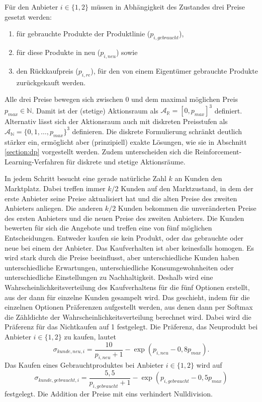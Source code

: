 Für den Anbieter $i\in\{1, 2\}$ müssen in Abhängigkeit des Zustandes drei Preise gesetzt werden:
\begin{enumerate}
	\item für gebrauchte Produkte der Produktlinie ($p_{i, gebraucht}$),
	\item für diese Produkte in neu ($p_{i, neu}$) sowie
	\item den Rückkaufpreis ($p_{i, re}$), für den von einem Eigentümer gebrauchte Produkte zurückgekauft werden.
\end{enumerate}
Alle drei Preise bewegen sich zwischen 0 und dem maximal möglichen Preis $p_{max} \in \mathbb{N}$.
Damit ist der (stetige) Aktionsraum als $\mathcal{A}_\mathbb{R}=[0{,} p_{max}]^3$ definiert.
Alternativ lässt sich der Aktionsraum auch mit diskreten Preisstufen als $\mathcal{A}_\mathbb{N}=\{0{,} 1, \ldots, p_{max}\}^3$ definieren.
Die diskrete Formulierung schränkt deutlich stärker ein, ermöglicht aber (prinzipiell) exakte Lösungen, wie sie in Abschnitt \ref{section:dp} vorgestellt werden.
Zudem unterscheiden sich die Reinforcement-Learning-Verfahren für diskrete und stetige Aktionsräume.

In jedem Schritt besucht eine gerade natürliche Zahl $k$ an Kunden den Marktplatz.
Dabei treffen immer $k / 2$ Kunden auf den Marktzustand, in dem der erste Anbieter seine Preise aktualisiert hat und die alten Preise des zweiten Anbieters anliegen.
Die anderen $k / 2$ Kunden bekommen die unveränderten Preise des ersten Anbieters und die neuen Preise des zweiten Anbieters.
Die Kunden bewerten für sich die Angebote und treffen eine von fünf möglichen Entscheidungen.
Entweder kaufen sie kein Produkt, oder das gebrauchte oder neue bei einem der Anbieter.
Das Kaufverhalten ist aber keinesfalls homogen.
Es wird stark durch die Preise beeinflusst, aber unterschiedliche Kunden haben unterschiedliche Erwartungen, unterschiedliche Konsumgewohnheiten oder unterschiedliche Einstellungen zu Nachhaltigkeit.
Deshalb wird eine Wahrscheinlichkeitsverteilung des Kaufverhaltens für die fünf Optionen erstellt, aus der dann für einzelne Kunden gesampelt wird.
Das geschieht, indem für die einzelnen Optionen Präferenzen aufgestellt werden, aus denen dann per Softmax die Zähldichte der Wahrscheinlichkeitsverteilung berechnet wird.
Dabei wird die Präferenz für das Nichtkaufen auf 1 festgelegt.
Die Präferenz, das Neuprodukt bei Anbieter $i\in\{1, 2\}$ zu kaufen, lautet
\begin{equation}
	\sigma_{kunde, neu, i} = \frac{10}{p_{i, neu} + 1} - \exp{(p_{i, neu} - 0{,}8 p_{max})}.
\end{equation}
Das Kaufen eines Gebrauchtproduktes bei Anbieter $i\in\{1, 2\}$ wird auf
\begin{equation}
	\sigma_{kunde, gebraucht, i} = \frac{5{,}5}{p_{i, gebraucht} + 1} - \exp{(p_{i, gebraucht} - 0{,}5 p_{max})}
\end{equation}
festgelegt.
Die Addition der Preise mit eins verhindert Nulldivision.

